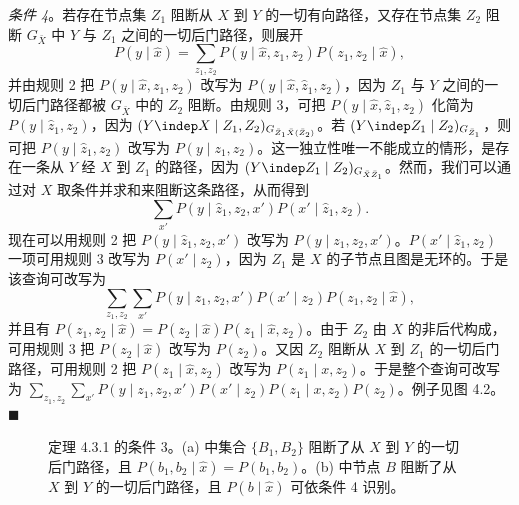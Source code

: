 \emph{条件 4}。若存在节点集 $Z_1$ 阻断从 $X$ 到 $Y$ 的一切有向路径，又存在节点集 $Z_2$ 阻断 $G_{\bar{X}}$ 中 $Y$ 与 $Z_1$ 之间的一切后门路径，则展开
\[
P(y\mid\hat{x})=\sum_{z_1,z_2}P(y\mid\hat{x},z_1,z_2)P(z_1,z_2\mid\hat{x}),
\]
并由规则 2 把 $P(y\mid\hat{x},z_1,z_2)$ 改写为 $P(y\mid\hat{x},\hat{z}_1,z_2)$，因为 $Z_1$ 与 $Y$ 之间的一切后门路径都被 $G_{\bar{X}}$ 中的 $Z_2$ 阻断。由规则 3，可把 $P(y\mid\hat{x},\hat{z}_1,z_2)$ 化简为 $P(y\mid\hat{z}_1,z_2)$，因为 $(Y\indep X\mid Z_1,Z_2)_{G_{\bar{Z}_1\bar{X}(\bar{Z}_2)}}$。若 $(Y\indep Z_1\mid Z_2)_{G_{\bar{Z}_1}}$，则可把 $P(y\mid\hat{z}_1,z_2)$ 改写为 $P(y\mid z_1,z_2)$。这一独立性唯一不能成立的情形，是存在一条从 $Y$ 经 $X$ 到 $Z_1$ 的路径，因为 $(Y\indep Z_1\mid Z_2)_{G_{\bar{X}\bar{Z}_1}}$。然而，我们可以通过对 $X$ 取条件并求和来阻断这条路径，从而得到
\[
\sum_{x'}P(y\mid\hat{z}_1,z_2,x')P(x'\mid\hat{z}_1,z_2).
\]
现在可以用规则 2 把 $P(y\mid\hat{z}_1,z_2,x')$ 改写为 $P(y\mid z_1,z_2,x')$。$P(x'\mid\hat{z}_1,z_2)$ 一项可用规则 3 改写为 $P(x'\mid z_2)$，因为 $Z_1$ 是 $X$ 的子节点且图是无环的。于是该查询可改写为
\[
\sum_{z_1,z_2}\sum_{x'}P(y\mid z_1,z_2,x')P(x'\mid z_2)P(z_1,z_2\mid\hat{x}),
\]
并且有 $P(z_1,z_2\mid\hat{x})=P(z_2\mid\hat{x})P(z_1\mid\hat{x},z_2)$。由于 $Z_2$ 由 $X$ 的非后代构成，可用规则 3 把 $P(z_2\mid\hat{x})$ 改写为 $P(z_2)$。又因 $Z_2$ 阻断从 $X$ 到 $Z_1$ 的一切后门路径，可用规则 2 把 $P(z_1\mid\hat{x},z_2)$ 改写为 $P(z_1\mid x,z_2)$。于是整个查询可改写为 $\sum_{z_1,z_2}\sum_{x'}P(y\mid z_1,z_2,x')P(x'\mid z_2)P(z_1\mid x,z_2)P(z_2)$。例子见图 4.2。\hfill$\blacksquare$

\begin{figure}[htbp]
\centering
{}
\caption{定理 4.3.1 的条件 3。(a) 中集合 $\{B_1,B_2\}$ 阻断了从 $X$ 到 $Y$ 的一切后门路径，且 $P(b_1,b_2\mid\hat{x})=P(b_1,b_2)$。(b) 中节点 $B$ 阻断了从 $X$ 到 $Y$ 的一切后门路径，且 $P(b\mid\hat{x})$ 可依条件 4 识别。}
\label{fig:4.1}
\end{figure}

